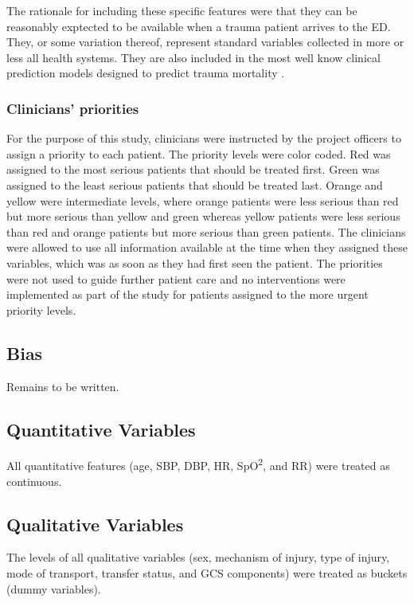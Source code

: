 \documentclass[10pt,letterpaper]{article}\usepackage[]{graphicx}\usepackage[]{color}
\begin{document}
The rationale for including these specific features were that they can be
reasonably exptected to be available when a trauma patient arrives to the
ED. They, or some variation thereof, represent standard variables collected in
more or less all health systems. They are also included in the most well know
clinical prediction models designed to predict trauma mortality \cite{Rehn2011}.

\subsubsection*{Clinicians' priorities}
For the purpose of this study, clinicians were instructed by the project
officers to assign a priority to each patient. The priority levels were color
coded. Red was assigned to the most serious patients that should be treated
first. Green was assigned to the least serious patients that should be treated
last. Orange and yellow were intermediate levels, where orange patients were
less serious than red but more serious than yellow and green whereas yellow
patients were less serious than red and orange patients but more serious than
green patients. The clinicians were allowed to use all information available at
the time when they assigned these variables, which was as soon as they had first
seen the patient. The priorities were not used to guide further patient care and
no interventions were implemented as part of the study for patients assigned to
the more urgent priority levels.

\subsection*{Bias}
Remains to be written.

\subsection*{Quantitative Variables}
All quantitative features (age, SBP, DBP, HR, SpO\textsuperscript{2}, and RR) were
treated as continuous.

\subsection*{Qualitative Variables}
The levels of all qualitative variables (sex, mechanism of injury, type of
injury, mode of transport, transfer status, and GCS components) were treated as
buckets (dummy variables).
\end{document}
